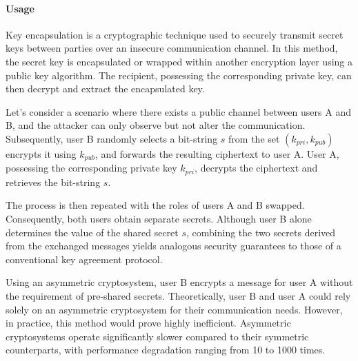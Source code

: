\paragraph*{Usage}
Key encapsulation is a cryptographic technique used to securely transmit secret keys between parties over an insecure communication channel. 
In this method, the secret key is encapsulated or wrapped within another encryption layer using a public key algorithm. 
The recipient, possessing the corresponding private key, can then decrypt and extract the encapsulated key.
\begin{example}
    Let's consider a scenario where there exists a public channel between users A and B, and the attacker can only observe but not alter the communication.
    Subsequently, user B randomly selects a bit-string $s$ from the set $\left(k_{pri},k_{pub}\right)$ encrypts it using $k_{pub}$, and forwards the resulting ciphertext to user A. 
    User A, possessing the corresponding private key $k_{pri}$, decrypts the ciphertext and retrieves the bit-string $s$. 

    The process is then repeated with the roles of users A and B swapped. 
    Consequently, both users obtain separate secrets. 
    Although user B alone determines the value of the shared secret $s$, combining the two secrets derived from the exchanged messages yields analogous security guarantees to those of a conventional key agreement protocol.
\end{example}
Using an asymmetric cryptosystem, user B encrypts a message for user A without the requirement of pre-shared secrets. 
Theoretically, user B and user A could rely solely on an asymmetric cryptosystem for their communication needs. 
However, in practice, this method would prove highly inefficient.
Asymmetric cryptosystems operate significantly slower compared to their symmetric counterparts, with performance degradation ranging from 10 to 1000 times.

